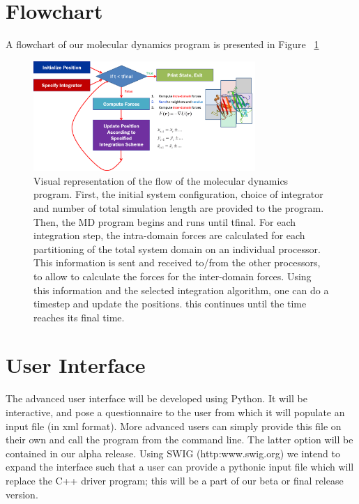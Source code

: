 \documentclass[10pt]{article}
\begin{document}
\section{Flowchart}
A flowchart of our molecular dynamics program is presented in Figure ~\ref{fig:flowchart}
\begin{figure}
\centering
\includegraphics[width=0.75\textwidth]{flowchart.png}
\caption{Visual representation of the flow of the molecular dynamics program. First, the initial system configuration, choice of integrator and number of total simulation length are provided to the program. Then, the MD program begins and runs until tfinal. For each integration step, the intra-domain forces are calculated for each partitioning of the total system domain on an individual processor. This information is sent and received to/from the other processors, to allow to calculate the forces for the inter-domain forces. Using this information and the selected integration algorithm, one can do a timestep and update the positions. this continues until the time reaches its final time.}
\label{fig:flowchart}
\end{figure}


\section{User Interface}
The advanced user interface will be developed using Python. It will be interactive, and pose a questionnaire to the user from which it will populate an input file (in xml format).  More advanced users can simply provide this file on their own and call the program from the command line.  The latter option will be contained in our alpha release.  Using SWIG (http:www.swig.org) we intend to expand the interface such that a user can provide a pythonic input file which will replace the C++ driver program; this will be a part of our beta or final release version.
\end{document}
